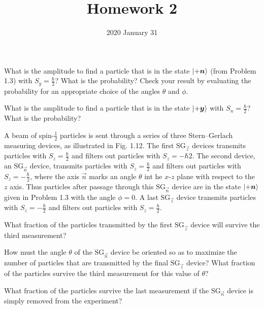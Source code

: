 \documentclass{../phys116}
\title{Homework 2}
\author{}
\date{2020 January 31}
\begin{document}
\begin{exercise}
  \begin{problems}
  \item What is the amplitude to find a particle that is in the state
    \(\ket{+\vec n}\) (from Problem 1.3) with \(S_y = \frac \hbar 2\)?
    What is the probability?  Check your result by evaluating the
    probability for an appropriate choice of the angles \(\theta\) and
    \(\phi\).
  \item What is the amplitude to find a particle that is in the state
    \(\ket{+\vec y}\) with \(S_n = \frac \hbar 2\)?  What is the
    probability?
  \end{problems}
\end{exercise}

\begin{solution}
\end{solution}

\begin{exercise}
  \newcommand{\SG}{\mathrm{SG}}

  A beam of spin-\(\frac 1 2\) particles is sent through a series of
  three Stern--Gerlach measuring devices, as illustrated in Fig. 1.12.
  The first \(\SG_{\vec z}\) devices transmits particles with
  \(S_z = \frac \hbar 2\) and filters out particles with
  \(S_z = -\hbar 2\).  The second device, an \(\SG_{\vec n}\) device,
  transmits particles with \(S_z = \frac \hbar 2\) and filters out
  particles with \(S_z = -\frac \hbar 2\), where the axis \(\vec n\)
  marks an angle \(\theta\) int he \(x\)-\(z\) plane with respect to
  the \(z\) axis.  Thus particles after passage through this
  \(\SG_{\vec n}\) device are in the state \(\ket{+\vec n}\) given in
  Problem 1.3 with the angle \(\phi = 0\).  A last \(\SG_{\vec z}\)
  device transmits particles with \(S_z = -\frac \hbar 2\) and filters
  out particles with \(S_z = \frac \hbar 2\).
  \begin{problems}
  \item What fraction of the particles transmitted by the first
    \(\SG_{\vec z}\) device will survive the third measurement?
  \item How must the angle \(\theta\) of the \(\SG_{\vec n}\) device
    be oriented so as to maximize the number of particles that are
    transmitted by the final \(\SG_{\vec z}\) device?  What fraction
    of the particles survive the third measurement for this value of
    \(\theta\)?
  \item What fraction of the particles survive the last measurement if
    the \(\SG_{\vec n}\) device is simply removed from the experiment?
  \end{problems}
\end{exercise}
\end{document}
